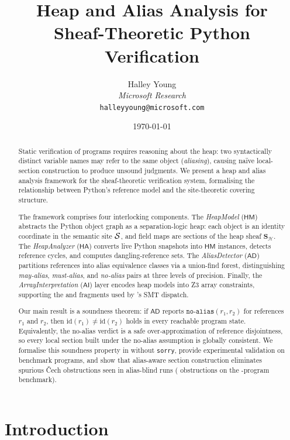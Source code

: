\documentclass[11pt]{article}
\title{\textbf{Heap and Alias Analysis for\\Sheaf-Theoretic Python Verification}}
\author{%
  Halley Young\\
  \textit{Microsoft Research}\\
  \texttt{halleyyoung@microsoft.com}
}
\date{\today}
\newcommand{\Heap}{\mathcal{H}}             %
\newcommand{\NoAlias}{\ensuremath{\mathtt{no\text{-}alias}}}     %
\newcommand{\AD}{\mathsf{AD}}               %
\newcommand{\HA}{\mathsf{HA}}               %
\newcommand{\HM}{\mathsf{HM}}               %
\newcommand{\AI}{\mathsf{AI}}               %
\newcommand{\SHeap}{\mathbf{S}_{\Heap}}    %
\begin{document}
\maketitle

\begin{abstract}
Static verification of \Python{} programs requires reasoning about the
heap: two syntactically distinct variable names may refer to the same
object (\emph{aliasing}), causing naïve local-section construction to
produce unsound judgments.  We present a heap and alias analysis
framework for the \JuGeo{} sheaf-theoretic verification system,
formalising the relationship between Python's reference model and the
site-theoretic covering structure.

The framework comprises four interlocking components.  The
\emph{HeapModel} ($\HM$) abstracts the Python object graph as a
separation-logic heap: each object is an identity coordinate in the
semantic site $\mathcal{S}$, and field maps are sections of the heap sheaf
$\SHeap$.  The \emph{HeapAnalyzer} ($\HA$) converts live Python
snapshots into $\HM$ instances, detects reference cycles, and computes
dangling-reference sets.  The \emph{AliasDetector} ($\AD$) partitions
references into alias equivalence classes via a union-find forest,
distinguishing \emph{may-alias}, \emph{must-alias}, and
\emph{no-alias} pairs at three levels of precision.  Finally, the
\emph{ArrayInterpretation} ($\AI$) layer encodes heap models into Z3
array constraints, supporting the \QFUF{} and \QFLIA{} fragments used
by \JuGeo{}'s SMT dispatch.

Our main result is a soundness theorem: if $\AD$ reports
$\NoAlias(r_1, r_2)$ for references $r_1$ and $r_2$, then
$\mathrm{id}(r_1) \neq \mathrm{id}(r_2)$ holds in every reachable
program state.  Equivalently, the no-alias verdict is a safe
over-approximation of reference disjointness, so every local section
built under the no-alias assumption is globally consistent.  We
formalise this soundness property in \LEAN{} without \texttt{sorry},
provide experimental validation on \numcases{} benchmark programs, and
show that alias-aware section construction eliminates
spurious Čech obstructions seen in alias-blind runs
(\expObstructionTotal{} obstructions on the \expTotalPrograms-program benchmark).
\end{abstract}


\section{Introduction}
\label{sec:intro}
\end{document}
